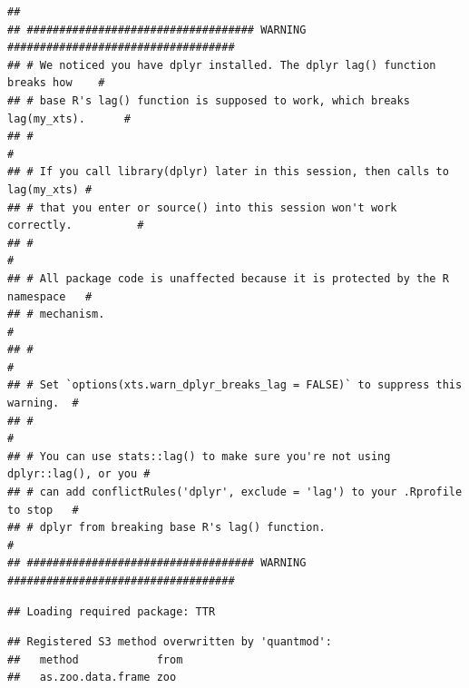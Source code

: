 \documentclass[
]{book}
\begin{document}
\begin{verbatim}
## 
## ################################### WARNING ###################################
## # We noticed you have dplyr installed. The dplyr lag() function breaks how    #
## # base R's lag() function is supposed to work, which breaks lag(my_xts).      #
## #                                                                             #
## # If you call library(dplyr) later in this session, then calls to lag(my_xts) #
## # that you enter or source() into this session won't work correctly.          #
## #                                                                             #
## # All package code is unaffected because it is protected by the R namespace   #
## # mechanism.                                                                  #
## #                                                                             #
## # Set `options(xts.warn_dplyr_breaks_lag = FALSE)` to suppress this warning.  #
## #                                                                             #
## # You can use stats::lag() to make sure you're not using dplyr::lag(), or you #
## # can add conflictRules('dplyr', exclude = 'lag') to your .Rprofile to stop   #
## # dplyr from breaking base R's lag() function.                                #
## ################################### WARNING ###################################
\end{verbatim}

\begin{verbatim}
## Loading required package: TTR
\end{verbatim}

\begin{verbatim}
## Registered S3 method overwritten by 'quantmod':
##   method            from
##   as.zoo.data.frame zoo
\end{verbatim}
\end{document}

